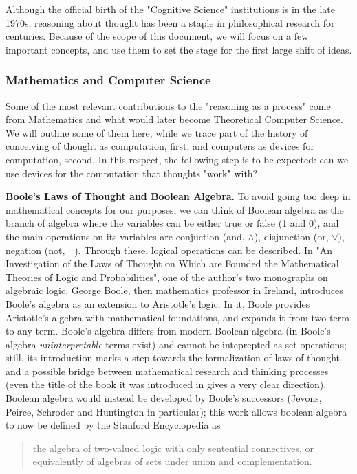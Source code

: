 \documentclass[../main.tex]{subfiles}
\begin{document}
Although the official birth of the "Cognitive Science" institutions is in the late 1970s, reasoning about thought has been a staple in philosophical research for centuries. Because of the scope of this document, we will focus on a few important concepts, and use them to set the stage for the first large shift of ideas.

\subsubsection{Mathematics and Computer Science}
Some of the most relevant contributions to the "reasoning as a process" come from Mathematics and what would later become Theoretical Computer Science. We will outline some of them here, while we trace part of the history of conceiving of thought as computation, first, and computers as devices for computation, second. In this respect, the following step is to be expected: can we use devices for the computation that thoughts "work" with?

\textbf{Boole's Laws of Thought and Boolean Algebra.} To avoid going too deep in mathematical concepts for our purposes, we can think of Boolean algebra as the branch of algebra where the variables can be either true or false (1 and 0), and the main operations on its variables are conjuction (and, $\wedge$), disjunction (or, $\vee$), negation (not, $\neg$). Through these, logical operations can be described.
In "An Investigation of the Laws of Thought on Which are Founded the Mathematical Theories of Logic and Probabilities", one of the author's two monographs on algebraic logic, George Boole, then mathematics professor in Ireland, introduces Boole's algebra as an extension to Aristotle's logic. In it, Boole provides Aristotle's algebra with mathematical foundations, and expands it from two-term to any-term. Boole's algebra differs from modern Boolean algebra (in Boole's algebra \textit{uninterpretable} terms exist) and cannot be inteprepted as set operations; still, its introduction marks a step towards the formalization of laws of thought and a possible bridge between mathematical research and thinking processes (even the title of the book it was introduced in gives a very clear direction). Boolean algebra would instead be developed by Boole's successors (Jevons, Peirce, Schroder and Huntington in particular); this work allows boolean algebra to now be defined by the Stanford Encyclopedia as
\begin{quote}
    the algebra of two-valued logic with only sentential connectives, or equivalently of algebras of sets under union and complementation.
\end{quote}
\end{document}
